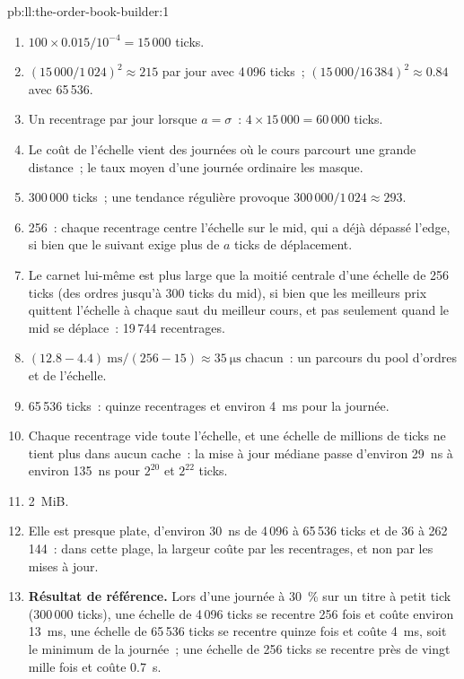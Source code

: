 \begin{solution}{pb:ll:the-order-book-builder:1}
\begin{enumerate}
\item $100 \times 0.015 / 10^{-4} = 15\,000$ ticks.
\item $(15\,000/1\,024)^2 \approx 215$ par jour avec 4\,096 ticks~; $(15\,000/16\,384)^2 \approx 0.84$ avec 65\,536.
\item Un recentrage par jour lorsque $a = \sigma$~: $4 \times 15\,000 = 60\,000$ ticks.
\item Le coût de l'échelle vient des journées où le cours parcourt une grande distance~; le taux moyen d'une journée ordinaire les masque.
\item 300\,000 ticks~; une tendance régulière provoque $300\,000/1\,024 \approx 293$.
\item 256~: chaque recentrage centre l'échelle sur le mid, qui a déjà dépassé l'edge, si bien que le suivant exige plus de
$a$ ticks de déplacement.
\item Le carnet lui-même est plus large que la moitié centrale d'une échelle de 256 ticks (des ordres jusqu'à 300 ticks du mid), si bien que les meilleurs
prix quittent l'échelle à chaque saut du meilleur cours, et pas seulement quand le mid se déplace~: 19\,744 recentrages.
\item $(12.8 - 4.4)~\text{ms}/(256 - 15) \approx \qty{35}{\micro\second}$ chacun~: un parcours du pool d'ordres et de l'échelle.
\item 65\,536 ticks~: quinze recentrages et environ \qty{4}{\milli\second} pour la journée.
\item Chaque recentrage vide toute l'échelle, et une échelle de millions de ticks ne tient plus dans aucun cache~: la mise à jour médiane
passe d'environ \qty{29}{\nano\second} à environ \qty{135}{\nano\second} pour $2^{20}$ et $2^{22}$ ticks.
\item 2~MiB.
\item Elle est presque plate, d'environ \qty{30}{\nano\second} de 4\,096 à 65\,536 ticks et de 36 à 262\,144~: dans cette plage, la largeur coûte par
les recentrages, et non par les mises à jour.
\item \textbf{Résultat de référence.} Lors d'une journée à 30~\% sur un titre à petit tick (300\,000 ticks), une échelle de 4\,096 ticks se recentre
256 fois et coûte environ \qty{13}{\milli\second}, une échelle de 65\,536 ticks se recentre quinze fois et coûte \qty{4}{\milli\second}, soit le
minimum de la journée~; une échelle de 256 ticks se recentre près de vingt mille fois et coûte \qty{0.7}{\second}.

\end{enumerate}
\end{solution}
